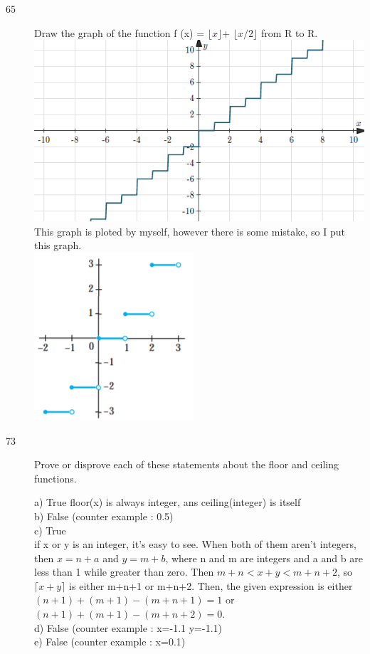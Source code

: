 \documentclass[UTF8]{article}
\begin{document}
\begin{description}
    \item[65]Draw the graph of the function f (x) = $\lfloor x \rfloor$+ $\lfloor x/2 \rfloor$ from
R to R.\\
        \includegraphics[scale=0.4]{../imgs/floor.png}\\
        This graph is ploted by myself, however there is some mistake, so I put this graph. \\
        \includegraphics[scale=0.4]{../imgs/floor1.png}\\


    \item[73]Prove or disprove each of these statements about the floor
and ceiling functions.

        a) True floor(x) is always integer, ans ceiling(integer) is itself\\
        b) False (counter example : 0.5) \\
        c) True  \\
        if x or y is an integer, it's easy to see. When  both of them aren't integers, then $x = n+a$  and $y = m +b$,
where n and m are integers and a and b are less than 1 while greater than zero. Then $m+n<x+y<m+n+2$, so
$\lceil x +y \rceil$ is either m+n+1 or m+n+2. Then, the given expression is either $(n + 1) + (m + 1) − (m + n + 1) = 1$ or
$(n + 1) + (m + 1)−(m+n+2) = 0$. \\
        d) False (counter example : x=-1.1 y=-1.1) \\
        e) False (counter example : x=0.1)
\end{description}
\end{document}
